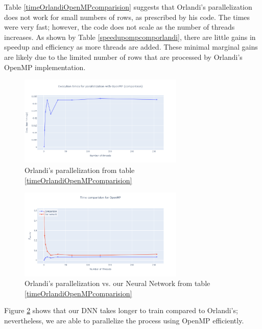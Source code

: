 \documentclass[11pt]{article}
\begin{document}
Table \ref{timeOrlandiOpenMPcomparision} suggests that Orlandi's parallelization does not work for small numbers of rows, as prescribed by his code. The times were very fast; however, the code does not scale as the number of threads increases. As shown by Table \ref{speedupompcomporlandi}, there are little gains in speedup and efficiency as more threads are added. These minimal marginal gains are likely due to the limited number of rows that are processed by Orlandi's OpenMP implementation.


\begin{figure}[H]
    \centering
    \includegraphics[width=0.7\textwidth]{Plots/comparision_openMP_time.png}
    \caption{Orlandi's parallelization from table \ref{timeOrlandiOpenMPcomparision}}
    \label{fig:speedupomporlandi}
\end{figure}

\begin{figure}[H]
    \centering
    \includegraphics[width=0.7\textwidth]{Plots/time_comp_openMP.png}
    \caption{Orlandi's parallelization vs. our Neural Network from table \ref{timeOrlandiOpenMPcomparision}}
    \label{fig:timecomparision}
\end{figure}

Figure \ref{fig:timecomparision} shows that our DNN takes longer to train compared to Orlandi's; nevertheless, we are able to parallelize the process using OpenMP efficiently.  
\end{document}
